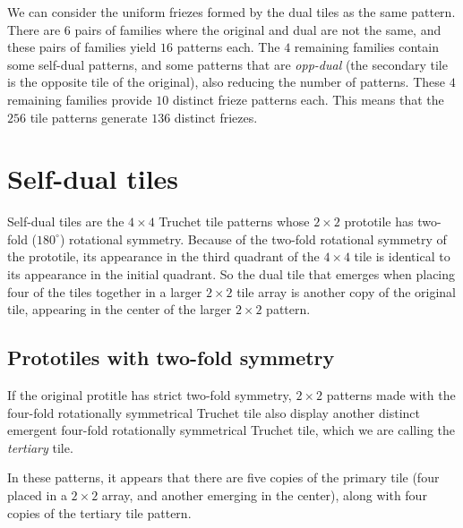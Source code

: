 \documentclass{tufte-book}
\begin{document}
\vspace{0.5cm}
\noindent
We can consider the uniform friezes formed by the dual tiles as the same pattern. There are $6$ pairs of families where the original and dual are not the same, and these pairs of families yield $16$ patterns each. The $4$ remaining families contain some self-dual patterns, and some patterns that are \textit{opp-dual} (the secondary tile is the opposite tile of the original), also reducing the number of patterns. These $4$ remaining families provide $10$ distinct frieze patterns each. This means that the $256$ tile patterns generate $136$ distinct friezes. 

\vspace{0.5cm}
\noindent

\noindent
\newpage



\chapter{Self-dual tiles}

\noindent
Self-dual tiles are the $4\times 4$ Truchet tile patterns whose $2\times 2$ prototile has two-fold ($180^{\circ}$) rotational symmetry. Because of the two-fold rotational symmetry of the prototile, its appearance in the third quadrant of the $4\times 4$ tile is identical to its appearance in the initial quadrant. So the dual tile that emerges when placing four of the tiles together in a larger $2\times 2$ tile array is another copy of the original tile, appearing in the center of the  larger $2\times 2$ pattern. 

\section{Prototiles with two-fold symmetry}

If the original protitle has strict two-fold symmetry,  $2\times 2$ patterns made with the four-fold rotationally symmetrical Truchet tile also display another distinct emergent four-fold rotationally symmetrical Truchet tile, which we are calling the \textit{tertiary} tile. 

\noindent
In these patterns, it appears that there are five copies of the primary tile (four placed in a $2\times 2$ array, and another emerging in the center), along with four copies of the tertiary tile pattern.

{
\setlength{\tabcolsep}{0pt}
\renewcommand{\arraystretch}{0}

}
\end{document}
